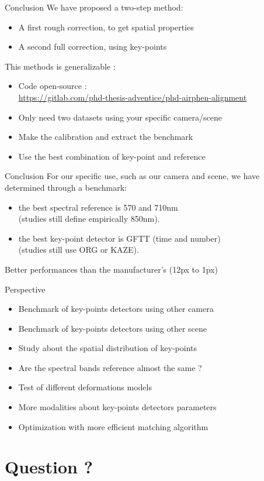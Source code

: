 \documentclass{beamer}
\begin{document}
		\begin{frame}{Conclusion}
			We have proposed a two-step method:
			\begin{itemize}
				\item A first rough correction, to get spatial properties
				\item A second full correction, using key-points
			\end{itemize}
		
			This methods is generalizable :
			\begin{itemize}
				\item Code open-source : \\ {\tiny \url{https://gitlab.com/phd-thesis-adventice/phd-airphen-alignment} }
				\item Only need two datasets using your specific camera/scene
				\item Make the calibration and extract the benchmark
				\item Use the best combination of key-point and reference
			\end{itemize}
		\end{frame}
	
		\begin{frame}{Conclusion}
			For our specific use, such as our camera and scene, we have determined through a benchmark:
			
			\begin{itemize}
				\item the best spectral reference is 570 and 710nm \\ (studies still define empirically 850nm).
				\item the best key-point detector is GFTT (time and number) \\ (studies still use ORG or KAZE).
			\end{itemize}
			
			Better performances than the manufacturer's (12px to 1px)
		\end{frame}
		\begin{frame}{Perspective}
			\begin{itemize}
				\item Benchmark of key-points detectors using other camera
				\item Benchmark of key-points detectors using other scene
				\item Study about the spatial distribution of key-points
				\item Are the spectral bands reference almost the same ?
				\item Test of different deformations models
				\item More modalities about key-points detectors parameters
				\item Optimization with more efficient matching algorithm
			\end{itemize}
		\end{frame}
	\section{Question ?}
			
\end{document}
